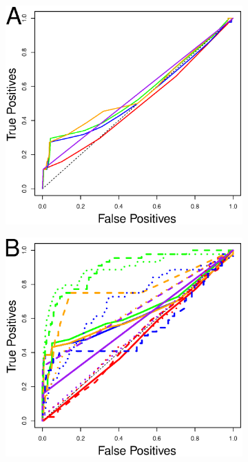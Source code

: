 \documentclass{acm_proc_article-sp}
\begin{document}
\begin{figure} [h]
\centering
\begin{subfigure}[b]{.2\textwidth}
\includegraphics[width=\textwidth]{figs/key_exp_roc.eps}
\end{subfigure}
\begin{subfigure}[b]{.2\textwidth}
\includegraphics[width=\textwidth]{figs/key_dm_roc.eps}

\end{subfigure}
\end{figure}
\end{document}
